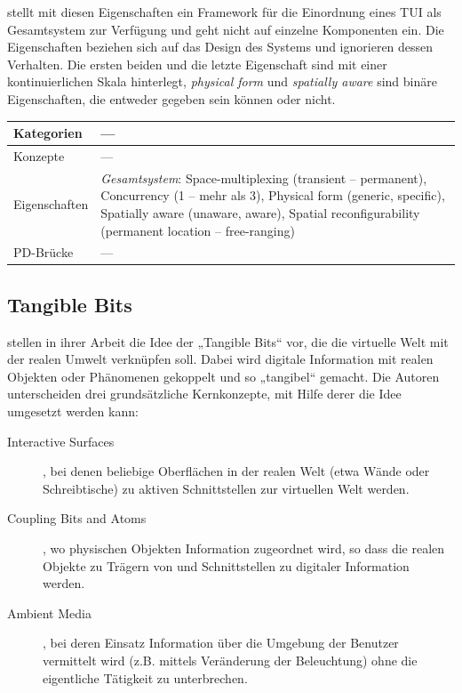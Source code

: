 \citeauthor{Fitzmaurice96} stellt mit diesen Eigenschaften ein Framework für die Einordnung eines \gls{TUI} als Gesamtsystem zur Verfügung und geht nicht auf einzelne Komponenten ein. Die Eigenschaften beziehen sich auf das Design des Systems und ignorieren dessen Verhalten. Die ersten beiden und die letzte Eigenschaft sind mit einer kontinuierlichen Skala hinterlegt, \emph{physical form} und \emph{spatially aware} sind binäre Eigenschaften, die entweder gegeben sein können oder nicht.
\\[1em]
\begin{tabular}{| p{3cm} | p{10cm} |}
  \hline
  Kategorien & --- \\ \hline
  Konzepte & --- \\ \hline
  Eigenschaften & \emph{Gesamtsystem}: Space-multiplexing (transient -- permanent), Concurrency (1 -- mehr als 3), Physical form (generic, specific), Spatially aware (unaware, aware), Spatial reconfigurability (permanent location -- free-ranging) \\ \hline
  PD-Brücke & --- \\ \hline
\end{tabular} 


\subsection{Tangible Bits} %
\label{sub:tangible_bits}

\citet{Ishii97} stellen in ihrer Arbeit die Idee der „Tangible Bits“ vor, die die virtuelle Welt mit der realen Umwelt verknüpfen soll. Dabei wird digitale Information mit realen Objekten oder Phänomenen gekoppelt und so „tangibel“ gemacht. Die Autoren unterscheiden drei grundsätzliche Kernkonzepte, mit Hilfe derer die Idee umgesetzt werden kann:
\begin{description}
	\item[Interactive Surfaces], bei denen beliebige Oberflächen in der realen Welt (etwa Wände oder Schreibtische) zu aktiven Schnittstellen zur virtuellen Welt werden.
	\item[Coupling Bits and Atoms], wo physischen Objekten Information zugeordnet wird, so dass die realen Objekte zu Trägern von und Schnittstellen zu digitaler Information werden.
	\item[Ambient Media], bei deren Einsatz Information über die Umgebung der Benutzer vermittelt wird (z.B. mittels Veränderung der Beleuchtung) ohne die eigentliche Tätigkeit zu unterbrechen. 
\end{description}


